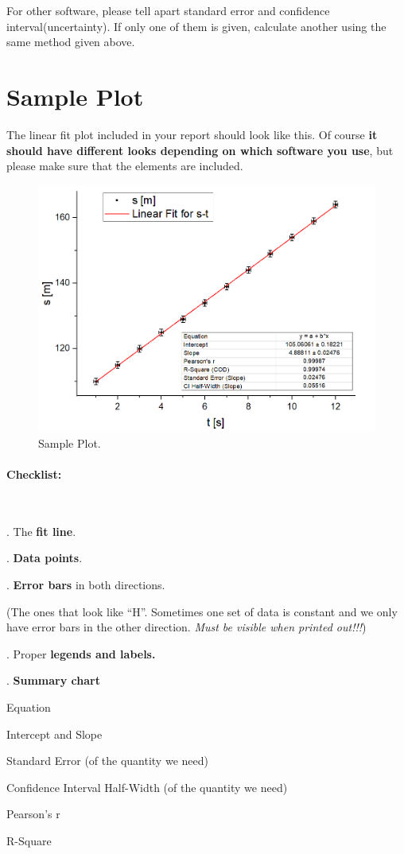 \documentclass[12pt]{article}
\begin{document}
\par For other software, please tell apart standard error and confidence interval(uncertainty). If only one of them is given, calculate another using the same method given above.
\newpage

\section{Sample Plot}

The linear fit plot included in your report should look like this. Of course \textbf{it should have different looks depending on which software you use}, but please make sure that the elements are included.

\begin{figure}[H]
\centering
\includegraphics[width=12cm]{sample.png}
\caption{Sample Plot.}
\end{figure}

\vspace{-1em}
\paragraph{Checklist:}\
\par{}. The \textbf{fit line}.
\par{}. \textbf{Data points}.
\par{}. \textbf{Error bars} in both directions. 

(The ones that look like ``H''. Sometimes one set of data is constant and we only have error bars in the other direction. \textit{Must be visible when printed out!!!})
\par\quad 4. Proper \textbf{legends and labels.}
\par{}. \textbf{Summary chart}
\par\qquad\quad Equation
\par\qquad\quad Intercept and Slope
\par\qquad\quad Standard Error {\footnotesize (of the quantity we need)}
\par\qquad\quad Confidence Interval Half-Width {\footnotesize (of the quantity we need)}
\par\qquad\quad Pearson's r
\par\qquad\quad R-Square
\newpage
\end{document}
